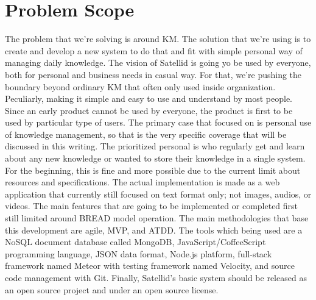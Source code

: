 \section{Problem Scope}
\label{sec:problem-scope}

The problem that we're solving is around \ac{KM}.
The solution that we're using is to create and develop a new system to do that and fit with simple personal way of managing daily knowledge.
The vision of Satellid is going yo be used by everyone, both for personal and business needs in casual way.
For that, we're pushing the boundary beyond ordinary \ac{KM} that often only used inside organization.
Peculiarly, making it simple and easy to use and understand by most people.
Since an early product cannot be used by everyone, the product is first to be used by particular type of users.
The primary case that focused on is personal use of knowledge management, so that is the very specific coverage that will be discussed in this writing.
The prioritized personal is who regularly get and learn about any new knowledge or wanted to store their knowledge in a single system.
For the beginning, this is fine and more possible due to the current limit about resources and specifications.
The actual implementation is made as a web application that currently still focused on text format only; not images, audios, or videos.
The main features that are going to be implemented or completed first still limited around \ac{BREAD} model operation.
The main methodologies that base this development are agile, \ac{MVP}, and \ac{ATDD}.
The tools which being used are a NoSQL document database called MongoDB, JavaScript/CoffeeScript programming language, JSON data format, Node.js platform, full-stack framework named Meteor with testing framework named Velocity, and source code management with Git.
Finally, Satellid's basic system should be released as an open source project and under an open source license.
